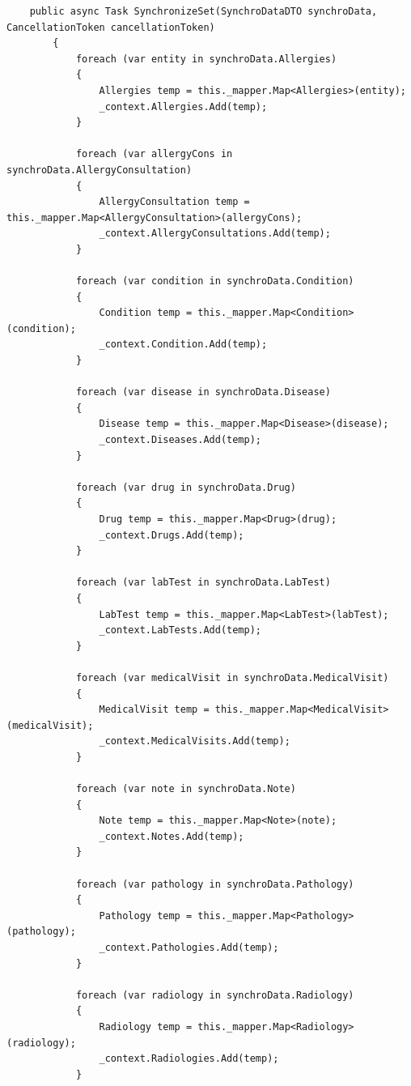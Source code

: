 \begin{lstlisting}
    public async Task SynchronizeSet(SynchroDataDTO synchroData, CancellationToken cancellationToken)
        {
            foreach (var entity in synchroData.Allergies)
            {
                Allergies temp = this._mapper.Map<Allergies>(entity);
                _context.Allergies.Add(temp);
            }

            foreach (var allergyCons in synchroData.AllergyConsultation)
            {
                AllergyConsultation temp = this._mapper.Map<AllergyConsultation>(allergyCons);
                _context.AllergyConsultations.Add(temp);
            }

            foreach (var condition in synchroData.Condition)
            {
                Condition temp = this._mapper.Map<Condition>(condition);
                _context.Condition.Add(temp);
            }

            foreach (var disease in synchroData.Disease)
            {
                Disease temp = this._mapper.Map<Disease>(disease);
                _context.Diseases.Add(temp);
            }

            foreach (var drug in synchroData.Drug)
            {
                Drug temp = this._mapper.Map<Drug>(drug);
                _context.Drugs.Add(temp);
            }

            foreach (var labTest in synchroData.LabTest)
            {
                LabTest temp = this._mapper.Map<LabTest>(labTest);
                _context.LabTests.Add(temp);
            }

            foreach (var medicalVisit in synchroData.MedicalVisit)
            {
                MedicalVisit temp = this._mapper.Map<MedicalVisit>(medicalVisit);
                _context.MedicalVisits.Add(temp);
            }

            foreach (var note in synchroData.Note)
            {
                Note temp = this._mapper.Map<Note>(note);
                _context.Notes.Add(temp);
            }

            foreach (var pathology in synchroData.Pathology)
            {
                Pathology temp = this._mapper.Map<Pathology>(pathology);
                _context.Pathologies.Add(temp);
            }

            foreach (var radiology in synchroData.Radiology) 
            {
                Radiology temp = this._mapper.Map<Radiology>(radiology);
                _context.Radiologies.Add(temp);
            }


\end{lstlisting}
